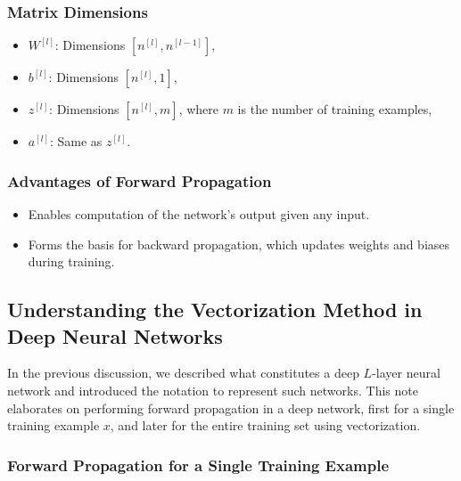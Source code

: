 \documentclass[letterpaper,12pt,notitlepage,twoside]{report}
\begin{document}
\subsubsection*{Matrix Dimensions}

\begin{itemize}
    \item \( W^{[l]} \): Dimensions \( [n^{[l]}, n^{[l-1]}] \),
    \item \( b^{[l]} \): Dimensions \( [n^{[l]}, 1] \),
    \item \( z^{[l]} \): Dimensions \( [n^{[l]}, m] \), where \( m \) is the number of training examples,
    \item \( a^{[l]} \): Same as \( z^{[l]} \).
\end{itemize}

\subsubsection*{Advantages of Forward Propagation}
\begin{itemize}
    \item Enables computation of the network's output given any input.
    \item Forms the basis for backward propagation, which updates weights and biases during training.
\end{itemize}

\subsection{Understanding the Vectorization Method in Deep Neural Networks}

In the previous discussion, we described what constitutes a deep \( L \)-layer neural network and introduced the notation to represent such networks. This note elaborates on performing forward propagation in a deep network, first for a single training example \( x \), and later for the entire training set using vectorization.

\subsubsection{Forward Propagation for a Single Training Example}
\end{document}
